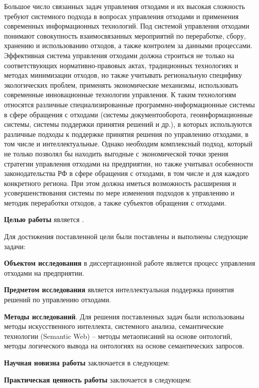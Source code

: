 \documentclass[a4paper]{G2-105}
\begin{document}
Большое число связанных задач управления отходами и их высокая сложность требуют системного подхода в вопросах управления отходами и применения современных информационных технологий. Под системой управления отходами понимают совокупность взаимосвязанных мероприятий по переработке, сбору, хранению и использованию отходов, а также контролем за данными процессами. Эффективная система управления отходами должна строиться не только на соответствующих нормативно-правовых актах, традиционных технологиях и методах минимизации отходов, но также учитывать региональную специфику экологических проблем, применять экономические механизмы, использовать современные инновационные технологии управления. К таким технологиям относятся различные специализированные программно-информационные системы в сфере обращения с отходами (системы документооборота, геоинформационные системы, системы поддержки принятия решений и др.), в которых используются различные подходы к поддержке принятия решения по управлению отходами, в том числе и интеллектуальные. Однако необходим комплексный подход, который не только позволял бы находить выгодные с экономической точки зрения стратегии управления отходами на предприятии, но также учитывал особенности законодательства РФ в сфере обращения с отходами, в том числе и для каждого конкретного региона. При этом должна иметься возможность расширения и усовершенствования системы по мере изменения подходов к управлению и методик переработки отходов, а также субъектов обращения с отходами. 

\textbf{Целью работы} является \CommonGoal.

Для достижения поставленной цели были поставлены и выполнены следующие задачи:
\CommonTasks

\textbf{Объектом исследования} в диссертационной работе является процесс управления отходами на предприятии.

\textbf{Предметом исследования} является интеллектуальная поддержка принятия решений по управлению отходами.

\textbf{Методы исследований}. Для решения поставленных задач были использованы методы искусственного интеллекта, системного анализа, семантические технологии (Semantic Web) -- методы метаописаний на основе онтологий, методы логического вывода на онтологиях на основе семантических запросов.

\textbf{Научная новизна работы} заключается в следующем:
\CommonScientificNovations

\textbf{Практическая ценность работы} заключается в следующем:
\CommonPracticalValue
\end{document}
